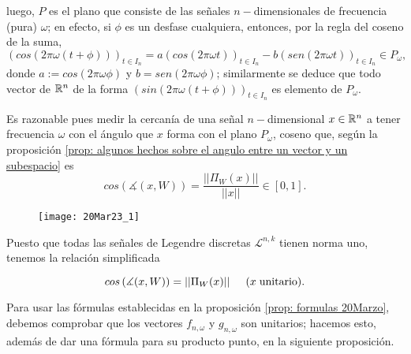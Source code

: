 luego, $P$ es el plano que consiste de las señales
$n-$dimensionales de frecuencia (pura) $\omega$;
en efecto, si $\phi$ es un desfase cualquiera, entonces,
por la regla del coseno de la suma,
\[
(cos (2 \pi \omega (t + \phi)))_{t \in I_{n}}
= a  (cos(2 \pi \omega t))_{t \in I_{n}} -
b  (sen(2 \pi \omega t))_{t \in I_{n}} \in P_{\omega},
\]
donde
$a:= cos(2 \pi \omega \phi)$ y $b= sen(2 \pi \omega \phi)$;
similarmente se deduce que todo vector de $\mathbb{R}^{n}$ 
de la forma $(sin (2 \pi \omega (t + \phi)))_{t \in I_{n}}$
es elemento de $P_{\omega}$.



Es razonable pues
medir la cercanía de una señal $n-$dimensional $x \in \mathbb{R}^{n}$
a tener frecuencia $\omega$
con el ángulo que $x$ forma con el plano $P_{\omega}$,
coseno que, según la proposición
\ref{prop: algunos hechos sobre el angulo entre un vector y un subespacio}
es
\begin{equation}
\label{eq0: 20Mar}
cos \left( \measuredangle (x, W) \right) = \frac{|| \Pi_{W}(x) ||}{||x||}
\in [0,1].
\end{equation}


\begin{figure}[H]
	\centering
	\texttt{[image: 20Mar23\_1]} 
\end{figure}	

Puesto que todas las señales de Legendre discretas
$\mathcal{L}^{n,k}$ tienen norma uno,
tenemos la relación simplificada 

\begin{equation}
\label{eq1: 20Mar}
cos \left( \measuredangle (x, W) \right) = || \Pi_{W}(x) || 
\hspace{0.5cm} (x \hspace{0.1cm} \text{unitario).}
\end{equation}

Para usar las fórmulas establecidas en 
la proposición \ref{prop: formulas 20Marzo}, debemos comprobar
que los vectores $f_{n, \omega}$ y $g_{n, \omega}$
son unitarios; hacemos esto, además de dar una fórmula
para su producto punto, en la siguiente proposición.


